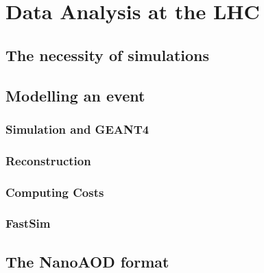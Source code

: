 \chapter{Data Analysis at the LHC}\label{ch:introduction}


\section{The necessity of simulations}

\section{Modelling an event}

\subsection{Simulation and GEANT4}

\subsection{Reconstruction}

\subsection{Computing Costs}

\subsection{FastSim}

\section{The NanoAOD format}




